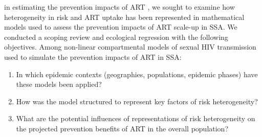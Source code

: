 in estimating the prevention impacts of ART \cite{Eaton2012,Delva2012},
we sought to examine how heterogeneity in risk and ART uptake has been represented
in mathematical models used to assess the prevention impacts of ART scale-up in SSA.
We conducted a scoping review and ecological regression with the following objectives.
Among non-linear compartmental models of sexual HIV transmission
used to simulate the prevention impacts of ART in SSA:
\begin{enumerate}
  \item\label{sr.rq.1}
    In which epidemic contexts (geographies, populations, epidemic phases)
    have these models been applied?
  \item\label{sr.rq.2}
    How was the model structured to represent key factors of risk heterogeneity?
  \item\label{sr.rq.3}
    What are the potential influences of representations of risk heterogeneity
    on the projected prevention benefits of ART in the overall population?
\end{enumerate}